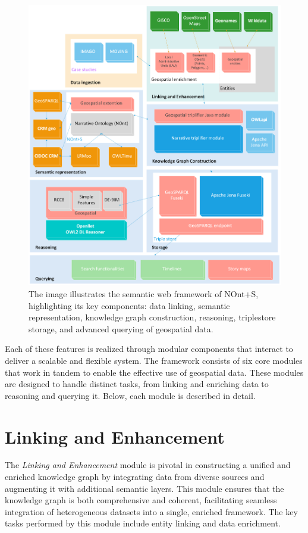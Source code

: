 \begin{figure}[h!tb]
    \centerline {\includegraphics[scale=0.4]{img/SemanticFramework.png}}
    \caption{The image illustrates the semantic web framework of NOnt+S, highlighting its key components: data linking, semantic representation, knowledge graph construction, reasoning, triplestore storage, and advanced querying of geospatial data.}
    \label{fig:SemanticFramework}
\end{figure}

Each of these features is realized through modular components that interact to deliver a scalable and flexible system. The framework consists of six core modules that work in tandem to enable the effective use of geospatial data. These modules are designed to handle distinct tasks, from linking and enriching data to reasoning and querying it. Below, each module is described in detail.

\section{Linking and Enhancement}\label{VI-sec:linking}

The \textit{Linking and Enhancement} module is pivotal in constructing a unified and enriched knowledge graph by integrating data from diverse sources and augmenting it with additional semantic layers. This module ensures that the knowledge graph is both comprehensive and coherent, facilitating seamless integration of heterogeneous datasets into a single, enriched framework. The key tasks performed by this module include entity linking and data enrichment.

